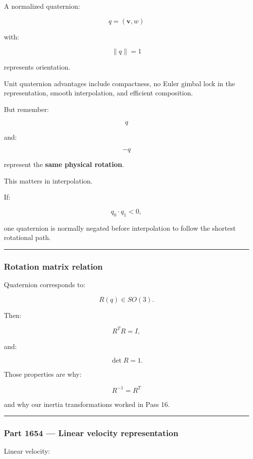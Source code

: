 A normalized quaternion:

\[
q=(\mathbf v,w)
\]

with:

\[
\|q\|=1
\]

represents orientation.

Unit quaternion advantages include compactness, no Euler gimbal lock in the representation, smooth interpolation, and efficient composition.

But remember:

\[
q
\]

and:

\[
-q
\]

represent the \textbf{same physical rotation}.

This matters in interpolation.

If:

\[
q_0\cdot q_1<0,
\]

one quaternion is normally negated before interpolation to follow the shortest rotational path.

\begin{center}\rule{0.5\linewidth}{0.5pt}\end{center}

\subsubsection{Rotation matrix relation}\label{rotation-matrix-relation}

Quaternion corresponds to:

\[
R(q)\in SO(3).
\]

Then:

\[
R^TR=I,
\]

and:

\[
\det R=1.
\]

Those properties are why:

\[
R^{-1}=R^T
\]

and why our inertia transformations worked in Pass 16.

\begin{center}\rule{0.5\linewidth}{0.5pt}\end{center}

\subsubsection{Part 1654 --- Linear velocity representation}\label{part-1654-linear-velocity-representation}

Linear velocity:

